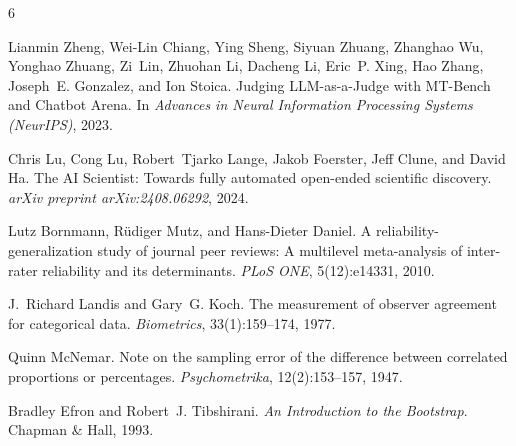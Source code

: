 \documentclass[11pt,a4paper]{article}
\begin{document}


\begin{thebibliography}{6}

Lianmin Zheng, Wei-Lin Chiang, Ying Sheng, Siyuan Zhuang, Zhanghao Wu,
Yonghao Zhuang, Zi~Lin, Zhuohan Li, Dacheng Li, Eric~P. Xing, Hao Zhang,
Joseph~E. Gonzalez, and Ion Stoica.
\newblock Judging {LLM}-as-a-{J}udge with {MT-B}ench and {C}hatbot {A}rena.
\newblock In \emph{Advances in Neural Information Processing Systems (NeurIPS)},
  2023.

Chris Lu, Cong Lu, Robert~Tjarko Lange, Jakob Foerster, Jeff Clune, and
David Ha.
\newblock The {AI} {S}cientist: Towards fully automated open-ended scientific
  discovery.
\newblock \emph{arXiv preprint arXiv:2408.06292}, 2024.

Lutz Bornmann, R\"udiger Mutz, and Hans-Dieter Daniel.
\newblock A reliability-generalization study of journal peer reviews: A
  multilevel meta-analysis of inter-rater reliability and its determinants.
\newblock \emph{PLoS ONE}, 5(12):e14331, 2010.

J.~Richard Landis and Gary~G. Koch.
\newblock The measurement of observer agreement for categorical data.
\newblock \emph{Biometrics}, 33(1):159--174, 1977.

Quinn McNemar.
\newblock Note on the sampling error of the difference between correlated
  proportions or percentages.
\newblock \emph{Psychometrika}, 12(2):153--157, 1947.

Bradley Efron and Robert~J. Tibshirani.
\newblock \emph{An Introduction to the Bootstrap}.
\newblock Chapman \& Hall, 1993.

\end{thebibliography}
\end{document}

